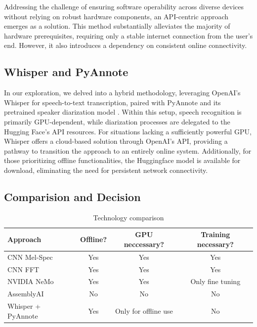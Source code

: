 \documentclass[12pt]{article}
\begin{document}
Addressing the challenge of ensuring software operability across diverse devices without relying on robust hardware components, an API-centric approach emerges as a solution. This method substantially alleviates the majority of hardware prerequisites, requiring only a stable internet connection from the user's end. However, it also introduces a dependency on consistent online connectivity.

\subsection{Whisper and PyAnnote}
\label{ssec:whisper}

In our exploration, we delved into a hybrid methodology, leveraging OpenAI's Whisper for speech-to-text transcription, paired with PyAnnote and its pretrained speaker diarization model \cite{Bredin2019}. Within this setup, speech recognition is primarily GPU-dependent, while diarization processes are delegated to the Hugging Face's API resources. For situations lacking a sufficiently powerful GPU, Whisper offers a cloud-based solution through OpenAI's API, providing a pathway to transition the approach to an entirely online system. Additionally, for those prioritizing offline functionalities, the Huggingface model is available for download, eliminating the need for persistent network connectivity.

\subsection{Comparision and Decision}
\label{ssec:comp}

\begin{table}[h]
    \centering
    \begin{tabular}{|l|c|c|c|}
        \hline
        \textbf{Approach} & \textbf{Offline?} & \textbf{GPU neccessary?} & \textbf{Training necessary?} \\ 
        \hline
        CNN Mel-Spec & Yes & Yes & Yes \\ 
        \hline
        CNN FFT & Yes & Yes & Yes \\ 
        \hline
        NVIDIA NeMo & Yes & Yes & Only fine tuning \\ 
        \hline
        AssemblyAI & No & No & No \\ 
        \hline
        Whisper + PyAnnote & Yes & Only for offline use & No \\ 
        \hline
    \end{tabular}
    \caption{Technology comparison} 
    \label{tab:tech-comp}
\end{table}
\end{document}

